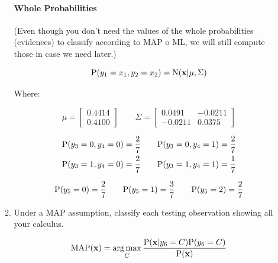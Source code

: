 \documentclass[12pt]{article}
\DeclareMathOperator*{\argmax}{arg\,max}
\begin{document}
\begin{enumerate}[leftmargin=\labelsep]
\begin{enumerate}
        \paragraph{Whole Probabilities}

        (Even though you don't need the values of the whole probabilities (evidences) to classify according to MAP o ML, we will still compute those in case we need later.)

        \begin{equation}
            \textrm{P}(y_1 = x_1, y_2 = x_2) = \textrm{N}(\mathbf{x} | \mu, \Sigma)
        \end{equation}

        Where:
    
        \begin{equation}
            \mu = \begin{bmatrix}
                0.4414 \\
                0.4100
            \end{bmatrix} \qquad \Sigma = \begin{bmatrix}
                0.0491 & -0.0211 \\
                -0.0211 & 0.0375
            \end{bmatrix}
        \end{equation}

        \begin{equation}
        \begin{split}
            \textrm{P}(y_3 = 0, y_4 = 0) = \frac{2}{7} &\qquad \textrm{P}(y_3 = 0, y_4 = 1) = \frac{2}{7} \\
            \textrm{P}(y_3 = 1, y_4 = 0) = \frac{2}{7} &\qquad \textrm{P}(y_3 = 1, y_4 = 1) = \frac{1}{7}
        \end{split}
        \end{equation}

        \begin{equation}
            \textrm{P}(y_5 = 0) = \frac{2}{7} \qquad \textrm{P}(y_5 = 1) = \frac{3}{7} \qquad \textrm{P}(y_5 = 2) = \frac{2}{7}
        \end{equation}

        \item Under a MAP assumption, classify each testing observation showing all your calculus.
    
        \begin{equation}
            \textrm{MAP}(\textbf{x}) = \argmax_C \frac{\prob(\textbf{x}|y_6 = C)\prob(y_6 = C)}{\prob(\textbf{x})}
        \end{equation}


\end{enumerate}
\end{enumerate}
\end{document}
